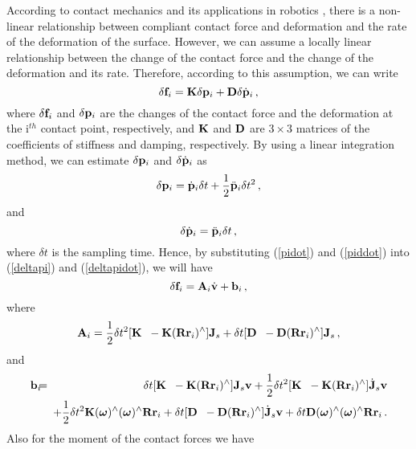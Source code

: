According to contact mechanics \cite{Johnson77} and its applications in
robotics \cite{Azad&Featherstone10, Azad&Featherstone14a, Hunt&Crossley75,
  Marhefka&Orin99}, there is a non-linear relationship between compliant
contact force and deformation and the rate of the deformation of the surface.
However, we can assume a locally linear relationship between the change of the
contact force and the change of the deformation and its rate.  Therefore,
according to this assumption, we can write
%
\begin{equation}
  \delta \mathbf{f}_i = \mathbf{K} \delta \mathbf{p}_i + \mathbf{D} \delta \dot{\mathbf{p}}_i \, ,
\end{equation}
%
where $\delta \mathbf{f}_i$ and $\delta \mathbf{p}_i$ are the changes of the contact force
and the deformation at the i$^{th}$ contact point, respectively, and $\mathbf{K}$ and
$\mathbf{D}$ are $3 \times 3$ matrices of the coefficients of stiffness and damping,
respectively.  By using a linear integration method, we can estimate $\delta
\mathbf{p}_i$ and $\delta \dot{\mathbf{p}}_i$ as
%
\begin{equation}
  \delta \mathbf{p}_i = \dot{\mathbf{p}}_i \delta t + \frac{1}{2} \ddot{\mathbf{p}}_i \delta t^2 \,
  ,
  \label{deltapi}
\end{equation}
%
and
%
\begin{equation}
  \delta \dot{\mathbf{p}}_i = \ddot{\mathbf{p}}_i \delta t \, ,
  \label{deltapidot}
\end{equation}
%
where $\delta t$ is the sampling time.  Hence, by substituting (\ref{pidot})
and (\ref{piddot}) into (\ref{deltapi}) and (\ref{deltapidot}), we will have
%
\begin{equation}
  \delta \mathbf{f}_i = \mathbf{A}_i \dot{\mathbf{v}} + \mathbf{b}_i \, ,
\end{equation}
%
where
%
%
\begin{equation}
  \mathbf{A}_i = \frac{1}{2} \delta t^2 [\mathbf{K} \; \; -\mathbf{K}(\mathbf{R} \mathbf{r}_i)^{\wedge}] \mathbf{J}_s +
  \delta t [\mathbf{D} \; \; - \mathbf{D}(\mathbf{R} \mathbf{r}_i)^{\wedge}] \mathbf{J}_s \, ,
\end{equation}
%
and
%
\begin{eqnarray}
  \nonumber \mathbf{b}_i & \!\!\!=\!\!\! & \delta t [\mathbf{K} \; \; -\mathbf{K}(\mathbf{R} \mathbf{r}_i)^{\wedge}] \mathbf{J}_s
  \mathbf{v} + \frac{1}{2} \delta t^2 [\mathbf{K} \; \; -\mathbf{K}(\mathbf{R} \mathbf{r}_i)^{\wedge}]
  \dot{\mathbf{J}}_s \mathbf{v}\\ & & + \frac{1}{2} \delta t^2 \mathbf{K} (\boldsymbol{\omega})^{\wedge}
  (\boldsymbol{\omega})^{\wedge} \mathbf{R} \mathbf{r}_i + \delta t [\mathbf{D} \; \; -\mathbf{D}(\mathbf{R} \mathbf{r}_i)^{\wedge}]
  \dot{\mathbf{J}}_s \mathbf{v} + \delta t \mathbf{D} (\boldsymbol{\omega})^{\wedge} (\boldsymbol{\omega})^{\wedge} \mathbf{R}
  \mathbf{r}_i \, .
\end{eqnarray}
%
Also for the moment of the contact forces we have
